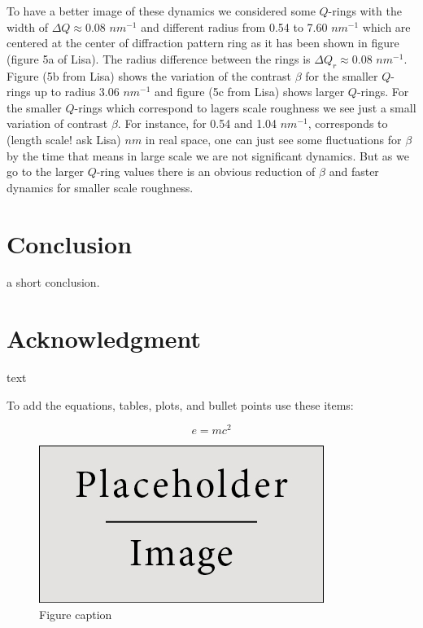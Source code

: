 \documentclass[preprint, 12pt]{elsarticle}
\begin{document}
To have a better image of these dynamics we considered some $Q$-rings with the width of $\Delta Q \approx 0.08$ $nm^{-1}$ and different radius from 0.54 to 7.60 $nm^{-1}$ which are centered at the center of diffraction pattern ring as it has been shown in figure (figure 5a of Lisa). The radius difference between the rings is $\Delta Q_r \approx 0.08$ $nm^{-1}$. Figure (5b from Lisa) shows the variation of the contrast $\beta$ for the smaller $Q$-rings up to radius 3.06 $nm^{-1}$ and figure (5c from Lisa) shows larger $Q$-rings. For the smaller $Q$-rings which correspond to lagers scale roughness we see just a small variation of contrast $\beta$. For instance, for 0.54 and 1.04 $nm^{-1}$, corresponds to (length scale! ask Lisa) $nm$ in real space, one can just see some fluctuations for $\beta$ by the time that means in large scale we are not significant dynamics. But as we go to the larger $Q$-ring values there is an obvious reduction of $\beta$ and faster dynamics for smaller scale roughness.

\section{Conclusion}

a short conclusion.

\section{Acknowledgment}
text
\newline
\newline
\newline
\newline
\newline


To add the equations, tables, plots, and bullet points use these items:

\begin{equation}
\label{eq:emc}
e = mc^2
\end{equation}

\begin{figure}[h]
\centering\includegraphics[width=0.4\linewidth]{placeholder}
\caption{Figure caption}
\end{figure}
\end{document}
